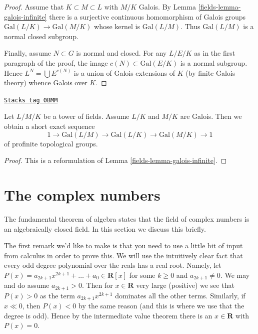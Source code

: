 \begin{proof}
\medskip\noindent
Assume that $K \subset M \subset L$ with $M/K$ Galois.
By Lemma \ref{fields-lemma-galois-infinite} there is a surjective
continuous homomorphism of Galois groups
$\text{Gal}(L/K) \to \text{Gal}(M/K)$ whose
kernel is $\text{Gal}(L/M)$. Thus $\text{Gal}(L/M)$ is a normal
closed subgroup.

\medskip\noindent
Finally, assume $N \subset G$ is normal and closed. For any
$L/E/K$ as in the first paragraph of the proof, the image
$c(N) \subset \text{Gal}(E/K)$ is a normal subgroup.
Hence $L^N = \bigcup E^{c(N)}$ is a union of Galois extensions
of $K$ (by finite Galois theory) whence Galois over $K$.
\end{proof}

\begin{lemma}
\label{fields-lemma-ses-infinite-galois}
\href{https://stacks.math.columbia.edu/tag/0BMM}{\texttt{Stacks tag 0BMM}}

Let $L/M/K$ be a tower of fields. Assume $L/K$ and $M/K$ are Galois.
Then we obtain a short exact sequence
$$
1 \to \text{Gal}(L/M) \to \text{Gal}(L/K) \to \text{Gal}(M/K) \to 1
$$
of profinite topological groups.
\end{lemma}

\begin{proof}

This is a reformulation of Lemma \ref{fields-lemma-galois-infinite}.
\end{proof}

\section{The complex numbers}
\label{fields-section-complex-numbers}
The fundamental theorem of algebra states that the field of complex numbers
is an algebraically closed field. In this section we discuss this
briefly.

\medskip\noindent
The first remark we'd like to make is that you need to use a little
bit of input from calculus in order to prove this. We will use the
intuitively clear fact that every odd degree polynomial over
the reals has a real root. Namely, let
$P(x) = a_{2k + 1} x^{2k + 1} + \ldots + a_0 \in \mathbf{R}[x]$
for some $k \geq 0$ and $a_{2k + 1} \not = 0$.
We may and do assume $a_{2k + 1} > 0$. Then for $x \in \mathbf{R}$
very large (positive) we see that $P(x) > 0$ as the term
$a_{2k + 1} x^{2k + 1}$ dominates all the other terms. Similarly,
if $x \ll 0$, then $P(x) < 0$ by the same reason (and this is where
we use that the degree is odd). Hence by the intermediate value
theorem there is an $x \in \mathbf{R}$ with $P(x) = 0$.

